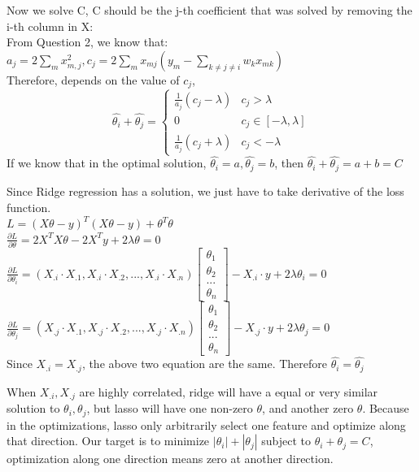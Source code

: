 \documentclass{article}
\newenvironment{sub}[2][$-$]{\begin{trivlist}
		\item[\hskip \labelsep {\bfseries #1}\hskip \labelsep {\bfseries #2.}]}  {\end{trivlist}}
\begin{document}
Now we solve C, C should be the j-th coefficient that was solved by removing the i-th column in X:\\
From Question 2, we know that:\\
$a_j = 2 \sum_m x^2_{m,j}, c_j = 2 \sum_m x_{mj}(y_m - \sum_{k \neq j \neq i} w_kx_{m k}) $ \\
Therefore, depends on the value of $c_j$, \[
\hat{\theta_i} +\hat{\theta_j} =\begin{cases}
\frac{1}{a_{j}}\left(c_{j}-\lambda\right) & c_{j}>\lambda\\
0 & c_{j}\in[-\lambda,\lambda]\\
\frac{1}{a_{j}}\left(c_{j}+\lambda\right) & c_{j}<-\lambda
\end{cases}
\]
If we know that in the optimal solution, $\hat{\theta_i} = a,\hat{\theta_j} = b$, then $\hat{\theta_i}+ \hat{\theta_j} = a+b = C$
 
 \begin{sub}{3.2.2}
 	\end{sub}
Since Ridge regression has a solution, we just have to take derivative of the loss function.\\
$L =  (X\theta - y)^T(X\theta -y) + \theta^T\theta$ \\
$\frac{\partial L}{\partial \theta} = 2X^TX\theta - 2X^Ty + 2\lambda\theta  = 0$\\
$\frac{\partial L}{\partial \theta_i}  = (X_{.i}\cdot X_{.1}, X_{.i}\cdot X_{.2}, ... ,X_{.i}\cdot X_{.n} ) \begin{bmatrix}
\theta_1 \\ \theta_2 \\...\\\theta_n
\end{bmatrix} - X_{.i} \cdot y + 2\lambda \theta_i = 0 $\\
$\frac{\partial L}{\partial \theta_j}  = (X_{.j}\cdot X_{.1}, X_{.j}\cdot X_{.2}, ... ,X_{.j}\cdot X_{.n} ) \begin{bmatrix}
\theta_1 \\ \theta_2 \\...\\\theta_n
\end{bmatrix} - X_{.j} \cdot y + 2\lambda \theta_j = 0$\\
Since $ X_{.i} = X_{.j}$, the above two equation are the same. Therefore $\hat{\theta_i} = \hat{\theta_j} $ 

\begin{sub}{3.2.3}
\end{sub}
When $X_{.i}, X_{.j}$ are highly correlated, ridge will have a equal or very similar solution to $\theta_i, \theta_j$, but lasso will have one non-zero $\theta$, and another zero $\theta$. Because in the optimizations, lasso only arbitrarily select one feature and optimize along that direction. Our target is to minimize $|\theta_i| + |\theta_j|$ subject  to $\theta_i + \theta_j = C$, optimization along one direction means zero at another direction.     
\end{document}
